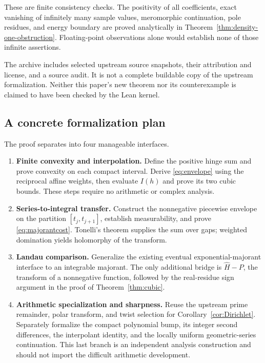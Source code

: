 \documentclass[11pt,a4paper]{article}
\theoremstyle{definition}
\theoremstyle{remark}
\numberwithin{equation}{section}
\begin{document}
These are finite consistency checks. The positivity of all
coefficients, exact vanishing of infinitely many sample values,
meromorphic continuation, pole residues, and energy boundary are
proved analytically in
Theorem~\ref{thm:density-one-obstruction}. Floating-point observations
alone would establish none of those infinite assertions.

The archive includes selected upstream source snapshots, their
attribution and license, and a source audit. It is not a complete
buildable copy of the upstream formalization. Neither this paper's
new theorem nor its counterexample is claimed to have been checked by
the Lean kernel.

\subsection{A concrete formalization plan}

The proof separates into four manageable interfaces.
\begin{enumerate}
\item \textbf{Finite convexity and interpolation.}
Define the positive hinge sum and prove convexity on each compact
interval. Derive \eqref{eq:envelope} using the reciprocal affine
weights, then evaluate \(I(h)\) and prove its two cubic bounds.
These steps require no arithmetic or complex analysis.
\item \textbf{Series-to-integral transfer.}
Construct the nonnegative piecewise envelope on the partition
\([t_j,t_{j+1}]\), establish measurability, and prove
\eqref{eq:majorantcost}. Tonelli's theorem supplies the sum over gaps;
weighted domination yields holomorphy of the transform.
\item \textbf{Landau comparison.}
Generalize the existing eventual exponential-majorant interface to
an integrable majorant. The only additional bridge is
\(\widehat H-P\), the transform of a nonnegative function, followed
by the real-residue sign argument in the proof of
Theorem~\ref{thm:cubic}.
\item \textbf{Arithmetic specialization and sharpness.}
Reuse the upstream prime remainder, polar transform, and twist
selection for Corollary~\ref{cor:Dirichlet}. Separately formalize the
compact polynomial bump, its integer second differences, the
interpolant identity, and the locally uniform geometric-series
continuation. This last branch is an independent analysis construction
and should not import the difficult arithmetic development.
\end{enumerate}
\end{document}
